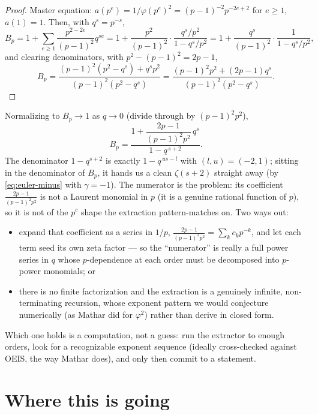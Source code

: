 \documentclass[11pt]{article}
\begin{document}
\begin{proof}
Master equation: $a(p^e)=1/\varphi(p^e)^2=(p-1)^{-2}p^{-2e+2}$ for $e\ge1$,
$a(1)=1$. Then, with $q^{s}=p^{-s}$,
\[
B_p = 1 + \sum_{e\ge1}\frac{p^{2-2e}}{(p-1)^2}q^{se}
= 1 + \frac{p^2}{(p-1)^2}\cdot\frac{q^{s}/p^2}{1-q^{s}/p^2}
= 1 + \frac{q^{s}}{(p-1)^2}\cdot\frac{1}{1-q^{s}/p^2},
\]
and clearing denominators, with $p^2-(p-1)^2=2p-1$,
\[
B_p=\frac{(p-1)^2(p^2-q^{s})+q^{s}p^2}{(p-1)^2(p^2-q^{s})}
      =\frac{(p-1)^2p^2+(2p-1)q^{s}}{(p-1)^2(p^2-q^{s})}.
\]
\end{proof}

Normalizing to $B_p\to1$ as $q\to0$ (divide through by $(p-1)^2p^2$),
\begin{equation}
\label{eq:phi-inv-sq-normalized}
B_p = \frac{1+\dfrac{2p-1}{(p-1)^2p^2}\,q^{s}}{1-q^{\,s+2}}.
\end{equation}
The denominator $1-q^{s+2}$ is exactly $1-q^{\,us-l}$ with $(l,u)=(-2,1)$; sitting in
the denominator of $B_p$, it hands us a clean $\zeta(s+2)$ straight away (by
\eqref{eq:euler-minus} with $\gamma=-1$). The numerator is the problem: its
coefficient $\frac{2p-1}{(p-1)^2p^2}$ is not a Laurent monomial in $p$ (it is a
genuine rational function of $p$), so it is not of the $p^{c}$ shape the extraction
pattern-matches on. Two ways out:

\begin{itemize}
\item expand that coefficient as a series in $1/p$,
$\frac{2p-1}{(p-1)^2p^2}=\sum_k c_k p^{-k}$, and let each term seed its own zeta
factor --- so the ``numerator'' is really a full power series in $q$ whose
$p$-dependence at each order must be decomposed into $p$-power monomials; or
\item there is no finite factorization and the extraction is a genuinely infinite,
non-terminating recursion, whose exponent pattern we would conjecture numerically
(as Mathar did for $\varphi^2$) rather than derive in closed form.
\end{itemize}
Which one holds is a computation, not a guess: run the extractor to enough orders,
look for a recognizable exponent sequence (ideally cross-checked against OEIS, the
way Mathar does), and only then commit to a statement.

\section{Where this is going}
\end{document}
